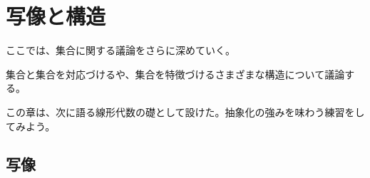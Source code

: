 \documentclass[../imaging-math]{subfiles}
\begin{document}
\chapter{写像と構造}

ここでは、集合に関する議論をさらに深めていく。

集合と集合を対応づけるや、集合を特徴づけるさまざまな構造について議論する。

\br

この章は、次に語る線形代数の礎として設けた。抽象化の強みを味わう練習をしてみよう。

\section{写像}

\wip
\end{document}
